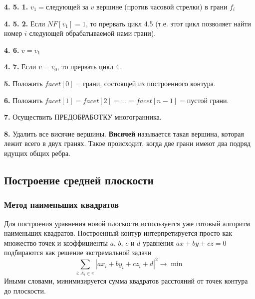 \documentclass[a4paper,12pt, titlepage]{article}
\begin{document}
\begin{flushleft}
 \textbf{4. 5. 1.} $v_{1} = $следующей за $v$ вершине (против часовой стрелки) в грани $f_{i}$
\end{flushleft} 
\begin{flushleft}
 \textbf{4. 5. 2.} Если $NF[v_{1}] = 1$, то прервать цикл 4.5 (т.е. этот цикл позволяет найти номер $i$ следующей
обрабатываемой нами грани).
\end{flushleft} 
\begin{flushleft}
 \textbf{4. 6.} $v = v_{1}$	
\end{flushleft} 
\begin{flushleft}
 \textbf{4. 7.} Если $v = v_{0}$, то прервать цикл 4.
\end{flushleft} 
\begin{flushleft}
 \textbf{5.} Положить $facet[0] = $грани, состоящей из построенного контура.
\end{flushleft} 
\begin{flushleft}
 \textbf{6.} Положить $facet[1] = facet[2] = \ldots = facet[n - 1] = $пустой грани.
\end{flushleft} 
\begin{flushleft}
 \textbf{7.} Осуществить ПРЕДОБРАБОТКУ многогранника.
\end{flushleft} 
\begin{flushleft}
 \textbf{8.} Удалить все висячие вершины. \textbf{Висячей} называется такая вершина, которая лежит всего в 
двух гранях. Такое происходит, когда две грани имеют два подряд идущих общих ребра.
\end{flushleft} 

\subsection{Построение средней плоскости}
\subsubsection{Метод наименьших квадратов}
\begin{flushleft}
  Для построения уравнения новой плоскости используется уже готовый алгоритм наименьших квадратов. Построенный
контур интерпретируется просто как множество точек и коэффициенты $a$, $b$, $c$ и $d$ уравнения 
$a x + b y + c z = 0$ подбираются как решение экстремальной задачи
$$
  \sum\limits_{i: A_{i} \in \pi}
	|a x_{i} + b y_{i} + c z_{i} + d |^{2} \to \min
$$
Иными словами, минимизируется сумма квадратов расстояний от точек контура до плоскости.
\end{flushleft} 
\end{document}
